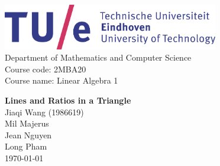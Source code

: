\begin{titlepage}
    \begin{center}
        \includegraphics[height=2cm]{figures/tue-logo-high} \\

        \large
        Department of Mathematics and Computer Science  \\
        Course code: 2MBA20 \\
        Course name: Linear Algebra 1 \\

        \vspace*{5cm}

        \huge
        \textbf{Lines and Ratios in a Triangle } \\
        \Large
        \vspace*{10mm}
        Jiaqi Wang (1986619) \\
        Mil Majerus  \\
        Jean Nguyen \\
        Long Pham \\

        \vfill
        \today
    \end{center}
\end{titlepage}